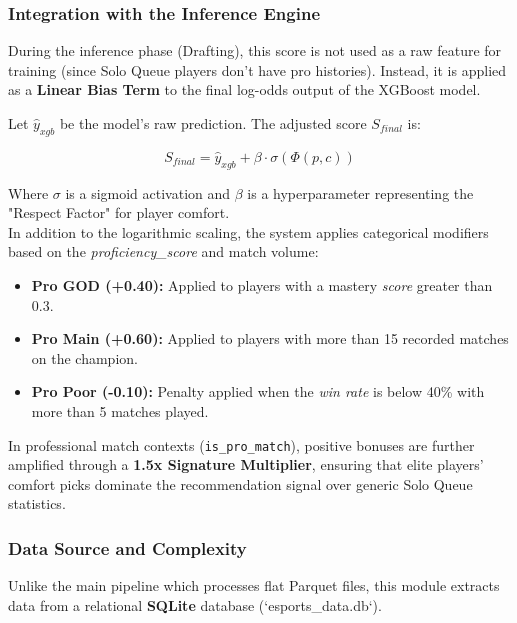 \documentclass[12pt, a4paper]{article}
\begin{document}
    \subsubsection{Integration with the Inference Engine}
    During the inference phase (Drafting), this score is not used as a raw feature for training (since Solo Queue players don't have pro histories). Instead, it is applied as a \textbf{Linear Bias Term} to the final log-odds output of the XGBoost model.

    Let $\hat{y}_{xgb}$ be the model's raw prediction. The adjusted score $S_{final}$ is:

    \begin{equation}
        S_{final} = \hat{y}_{xgb} + \beta \cdot \sigma(\Phi(p, c))
    \end{equation}

    Where $\sigma$ is a sigmoid activation and $\beta$ is a hyperparameter representing the "Respect Factor" for player comfort. \\

    In addition to the logarithmic scaling, the system applies categorical modifiers based on the \textit{proficiency\_score} and match volume:

    \begin{itemize}
        \item \textbf{Pro GOD (+0.40):} Applied to players with a mastery \textit{score} greater than 0.3.
        \item \textbf{Pro Main (+0.60):} Applied to players with more than 15 recorded matches on the champion.
        \item \textbf{Pro Poor (-0.10):} Penalty applied when the \textit{win rate} is below 40\% with more than 5 matches played.
    \end{itemize}

    In professional match contexts (\texttt{is\_pro\_match}), positive bonuses are further amplified through a \textbf{1.5x Signature Multiplier}, ensuring that elite players' comfort picks dominate the recommendation signal over generic Solo Queue statistics.



    \subsubsection{Data Source and Complexity}
    Unlike the main pipeline which processes flat Parquet files, this module extracts data from a relational \textbf{SQLite} database (`esports\_data.db`).
\end{document}
